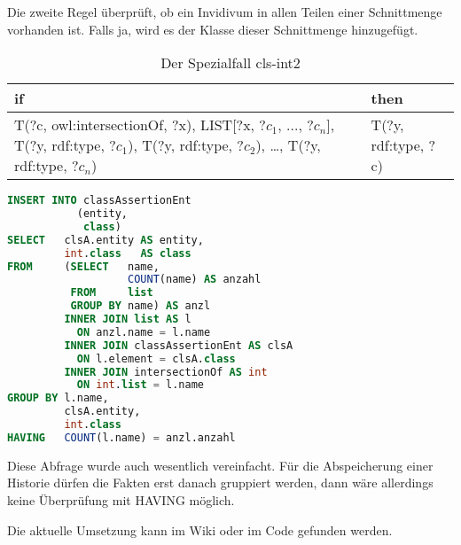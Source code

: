 Die zweite Regel überprüft, ob ein Invidivum in allen Teilen einer Schnittmenge vorhanden ist. Falls ja, wird es der Klasse dieser Schnittmenge hinzugefügt.
\begin{table}[htb]
\begin{center}
	\begin{tabular}{m{5cm}|m{3.5cm}}
	if & then \\ \hline
	T(?c, owl:intersectionOf, ?x),\newline
	LIST[?x, ?$c_1$, ..., ?$c_n$],\newline
	T(?y, rdf:type, ?$c_1$),\newline
	T(?y, rdf:type, ?$c_2$),\newline
	\ldots,\newline
	T(?y, rdf:type, ?$c_n$) & T(?y, rdf:type, ?c) 	 
	\end{tabular}
\end{center}
	\caption{Der Spezialfall cls-int2}
	\label{rule-cls-int2}
\end{table}


\begin{lstlisting}[language=SQL]
INSERT INTO classAssertionEnt
           (entity,
            class)
SELECT   clsA.entity AS entity,
         int.class   AS class
FROM     (SELECT   name,
                   COUNT(name) AS anzahl
          FROM     list
          GROUP BY name) AS anzl
         INNER JOIN list AS l
           ON anzl.name = l.name
         INNER JOIN classAssertionEnt AS clsA
           ON l.element = clsA.class
         INNER JOIN intersectionOf AS int
           ON int.list = l.name
GROUP BY l.name,
         clsA.entity,
         int.class
HAVING   COUNT(l.name) = anzl.anzahl
\end{lstlisting}

Diese Abfrage wurde auch wesentlich vereinfacht. Für die Abspeicherung einer Historie dürfen die Fakten erst danach gruppiert werden, dann wäre allerdings keine Überprüfung mit HAVING möglich.

Die aktuelle Umsetzung kann im Wiki oder im Code gefunden werden.

